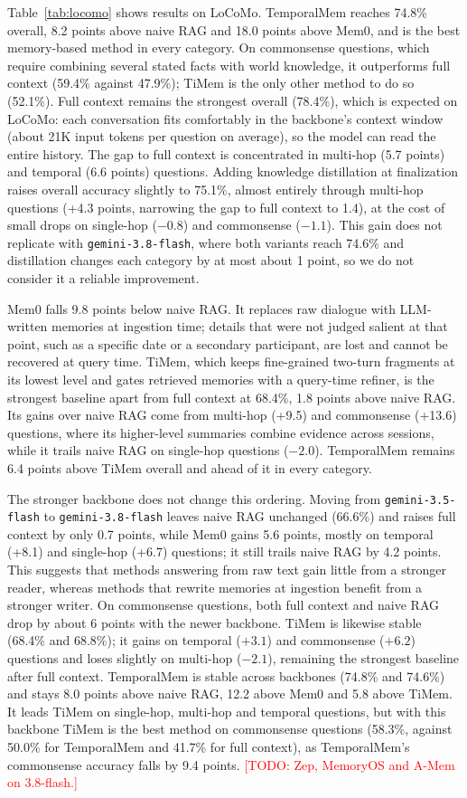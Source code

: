 \documentclass[11pt]{article}
\newcommand{\ours}{TemporalMem}
\newcommand{\todo}[1]{\textcolor{red}{[TODO: #1]}}
\begin{document}
Table~\ref{tab:locomo} shows results on LoCoMo. \ours{} reaches 74.8\% overall, 8.2 points above naive RAG and 18.0 points above Mem0, and is the best memory-based method in every category. On commonsense questions, which require combining several stated facts with world knowledge, it outperforms full context (59.4\% against 47.9\%); TiMem is the only other method to do so (52.1\%). Full context remains the strongest overall (78.4\%), which is expected on LoCoMo: each conversation fits comfortably in the backbone's context window (about 21K input tokens per question on average), so the model can read the entire history. The gap to full context is concentrated in multi-hop (5.7 points) and temporal (6.6 points) questions. Adding knowledge distillation at finalization raises overall accuracy slightly to 75.1\%, almost entirely through multi-hop questions (+4.3 points, narrowing the gap to full context to 1.4), at the cost of small drops on single-hop ($-0.8$) and commonsense ($-1.1$). This gain does not replicate with \texttt{gemini-3.8-flash}, where both variants reach 74.6\% and distillation changes each category by at most about 1 point, so we do not consider it a reliable improvement.

Mem0 falls 9.8 points below naive RAG. It replaces raw dialogue with LLM-written memories at ingestion time; details that were not judged salient at that point, such as a specific date or a secondary participant, are lost and cannot be recovered at query time. TiMem, which keeps fine-grained two-turn fragments at its lowest level and gates retrieved memories with a query-time refiner, is the strongest baseline apart from full context at 68.4\%, 1.8 points above naive RAG. Its gains over naive RAG come from multi-hop (+9.5) and commonsense (+13.6) questions, where its higher-level summaries combine evidence across sessions, while it trails naive RAG on single-hop questions ($-2.0$). \ours{} remains 6.4 points above TiMem overall and ahead of it in every category.

The stronger backbone does not change this ordering. Moving from \texttt{gemini-3.5-flash} to \texttt{gemini-3.8-flash} leaves naive RAG unchanged (66.6\%) and raises full context by only 0.7 points, while Mem0 gains 5.6 points, mostly on temporal (+8.1) and single-hop (+6.7) questions; it still trails naive RAG by 4.2 points. This suggests that methods answering from raw text gain little from a stronger reader, whereas methods that rewrite memories at ingestion benefit from a stronger writer. On commonsense questions, both full context and naive RAG drop by about 6 points with the newer backbone. TiMem is likewise stable (68.4\% and 68.8\%); it gains on temporal ($+3.1$) and commonsense ($+6.2$) questions and loses slightly on multi-hop ($-2.1$), remaining the strongest baseline after full context. \ours{} is stable across backbones (74.8\% and 74.6\%) and stays 8.0 points above naive RAG, 12.2 above Mem0 and 5.8 above TiMem. It leads TiMem on single-hop, multi-hop and temporal questions, but with this backbone TiMem is the best method on commonsense questions (58.3\%, against 50.0\% for \ours{} and 41.7\% for full context), as \ours{}'s commonsense accuracy falls by 9.4 points. \todo{Zep, MemoryOS and A-Mem on 3.8-flash.}
\end{document}
